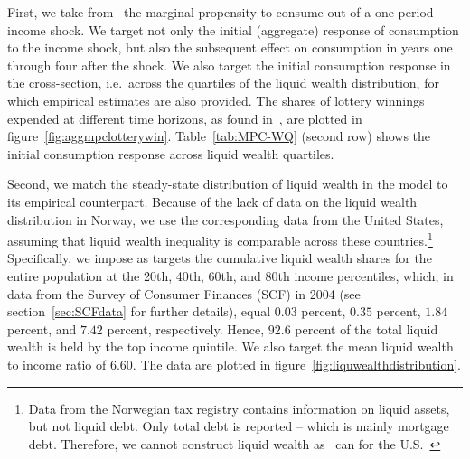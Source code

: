 \documentclass[qe]{econsocart}
\begin{document}
First, we take from~\cite{fagereng-mpc-2021} the marginal propensity to consume out of a one-period income shock. We target not only the initial (aggregate) response of consumption to the income shock, but also the subsequent effect on consumption in years one through four after the shock. We also target the initial consumption response in the cross-section, i.e.\ across the quartiles of the liquid wealth distribution, for which empirical estimates are also provided. The shares of lottery winnings expended at different time horizons, as found in~\cite{fagereng-mpc-2021}, are plotted in figure~\ref{fig:aggmpclotterywin}. Table~\ref{tab:MPC-WQ} (second row) shows the initial consumption response across liquid wealth quartiles.%

Second, we match the steady-state distribution of liquid wealth in the model to its empirical counterpart. Because of the lack of data on the liquid wealth distribution in Norway, we use the corresponding data from the United States, assuming that liquid wealth inequality is comparable across these countries.\footnote{Data from the Norwegian tax registry contains information on liquid assets, but not liquid debt. Only total debt is reported -- which is mainly mortgage debt. Therefore, we cannot construct liquid wealth as~\cite{kaplan2014model} can for the U.S.\ \label{foot:liqwealth}}
Specifically, we impose as targets the cumulative liquid wealth shares for the entire population at the 20th, 40th, 60th, and 80th income percentiles, which, in data from the Survey of Consumer Finances (SCF) in 2004 (see section~\ref{sec:SCFdata} for further details), equal $0.03$ percent, $0.35$ percent, $1.84$ percent, and $7.42$ percent, respectively. Hence, $92.6$ percent of the total liquid wealth is held by the top income quintile. We also target the mean liquid wealth to income ratio of 6.60. The data are plotted in figure~\ref{fig:liquwealthdistribution}.
\end{document}
